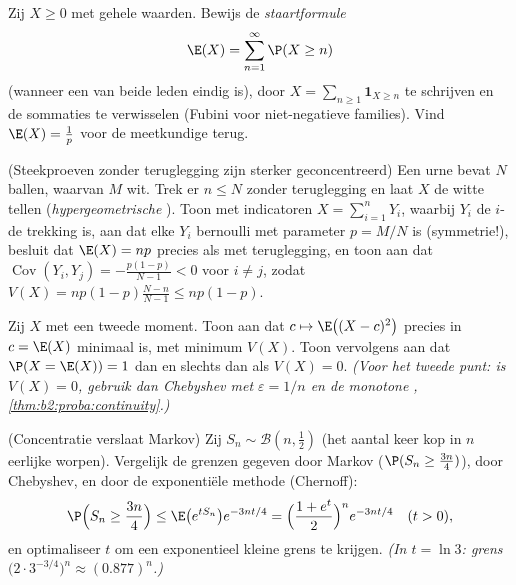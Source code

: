 \begin{exercise}[$\star\star$]\label{exo:b2:randomvar:4}
Zij $X \geq 0$ met gehele waarden. Bewijs de \emph{staartformule}
\[
\E(X) = \sum_{n=1}^{\infty} \P(X \geq n)
\]
(wanneer een van beide leden eindig is), door $X =
\sum_{n\geq1}\mathbf{1}_{X \geq n}$ te schrijven en de sommaties te
verwisselen (Fubini voor niet-negatieve families). Vind $\E(X) =
\frac1p$ voor de meetkundige  terug.
\end{exercise}

\begin{exercise}[$\star\star$]\label{exo:b2:randomvar:5}
(Steekproeven zonder teruglegging zijn sterker geconcentreerd) Een
urne bevat $N$ ballen, waarvan $M$ wit. Trek er $n \leq N$ zonder
teruglegging en laat $X$ de witte tellen (\emph{hypergeometrische}
). Toon met indicatoren $X = \sum_{i=1}^n Y_i$, waarbij
$Y_i$ de $i$-de trekking is, aan dat elke $Y_i$ bernoulli met
parameter $p = M/N$ is (symmetrie!), besluit dat $\E(X) = np$
precies als met teruglegging, en toon aan dat
$\operatorname{Cov}(Y_i, Y_j) = -\frac{p(1-p)}{N-1} < 0$ voor $i
\neq j$, zodat $V(X) = np(1-p)\frac{N - n}{N - 1} \leq np(1-p)$.
\end{exercise}

\begin{exercise}[$\star\star$]\label{exo:b2:randomvar:6}
Zij $X$ met een tweede moment. Toon aan dat $c \mapsto \E\bigl((X -
c)^2\bigr)$ precies in $c = \E(X)$ minimaal is, met minimum $V(X)$.
Toon vervolgens aan dat $\P(X = \E(X)) = 1$ dan en slechts dan als
$V(X) = 0$. \emph{(Voor het tweede punt: is $V(X) = 0$, gebruik dan
Chebyshev met $\varepsilon = 1/n$ en de monotone ,
\cref{thm:b2:proba:continuity}.)}
\end{exercise}

\begin{exercise}[$\star\star\star$]\label{exo:b2:randomvar:7}
(Concentratie verslaat Markov) Zij $S_n \sim \mathcal{B}(n,
\frac12)$ (het aantal keer kop in $n$ eerlijke worpen). Vergelijk
de grenzen gegeven door Markov ($\P(S_n \geq \frac{3n}{4})$), door
Chebyshev, en door de exponentiële methode (Chernoff):
\[
\P\Bigl(S_n \geq \frac{3n}4\Bigr)
\leq \E\bigl(e^{tS_n}\bigr)e^{-3nt/4}
= \Bigl(\frac{1 + e^t}{2}\Bigr)^n e^{-3nt/4}
\quad (t > 0),
\]
en optimaliseer $t$ om een exponentieel kleine grens te krijgen.
\emph{(In $t = \ln 3$: grens $\bigl(2\cdot 3^{-3/4}\bigr)^n \approx
(0.877)^n$.)}
\end{exercise}

